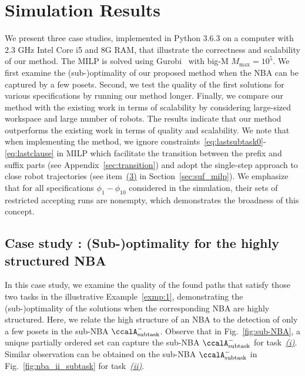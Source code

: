 \documentclass[Afour,sageh,times]{sagej}
\newcommand{\auto}[1]{\ccalA_{\textup{#1}}}
\newcommand{\RNum}[1]{\uppercase\expandafter{\romannumeral #1\relax}}
\begin{document}
{{\section{Simulation Results}\label{sec:sim}
We present three case studies, implemented in Python 3.6.3 on a computer with 2.3 GHz Intel Core i5 and 8G RAM, that illustrate the correctness and scalability of our method. The MILP is solved using Gurobi~\citep{gurobi} with big-M $M_{\text{max}}=10^5$. We first examine the (sub-)optimality of our proposed method when the NBA can be  captured by a few posets. Second, we test the quality of the first solutions for various specifications by running our method longer. Finally, we compare our method with the existing work in terms of scalability by considering large-sized workspace and large number of robots. The results indicate that our method outperforms the existing work in terms of quality and scalability. We note that when implementing the method, we ignore constraints~\eqref{eq:lastsubtask0}-\eqref{eq:lastclause} in MILP which facilitate the transition between the prefix and suffix parts (see Appendix~\ref{sec:transition}) and adopt the single-step approach to close robot trajectories (see item~\hyperref[sec:closing]{(3)} in Section~\ref{sec:suf_milp}). We emphasize that for all specifications $\phi_1-\phi_{10}$ considered in the simulation, their sets of restricted accepting runs are nonempty, which demonstrates the broadness of this concept.


\subsection{Case study \RNum{1}: (Sub-)optimality for the highly structured NBA}
In this case study, we examine the quality of the found paths that satisfy those two tasks in the illustrative Example~\ref{exmp:1}, demonstrating the (sub-)optimality of the solutions when the corresponding NBA are highly structured. Here, we relate the high structure of an NBA to the detection of only a few posets in the sub-NBA $\auto{subtask}^-$. Observe that in Fig.~\ref{fig:sub-NBA}, a unique partially ordered set can capture the sub-NBA $\auto{subtask}^-$ for task~\hyperref[task:i]{\it (i)}. Similar observation can be obtained  on the sub-NBA $\auto{subtask}^-$ in Fig.~\ref{fig:nba_ii_subtask} for task~\hyperref[task:ii]{\it (ii)}.

}}
\end{document}
